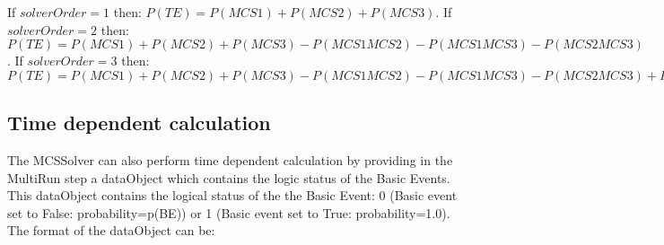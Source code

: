 If $solverOrder=1$ then: $P(TE) = P(MCS1)+P(MCS2)+P(MCS3)$.  
If $solverOrder=2$ then: $P(TE) = P(MCS1)+P(MCS2)+P(MCS3) - P(MCS1 MCS2) - P(MCS1 MCS3) - P(MCS2 MCS3)$.  
If $solverOrder=3$ then: $P(TE) = P(MCS1)+P(MCS2)+P(MCS3) - P(MCS1 MCS2) - P(MCS1 MCS3) - P(MCS2 MCS3) + P(MCS1 MCS2 MCS3)$

\subsection{Time dependent calculation}

The MCSSolver can also perform time dependent calculation by providing in the MultiRun step a dataObject which
contains the logic status of the Basic Events.
This dataObject contains the logical status of the the Basic Event: 0 (Basic event set to False: probability=p(BE)) 
or 1 (Basic event set to True: probability=1.0).
The format of the dataObject can be:
